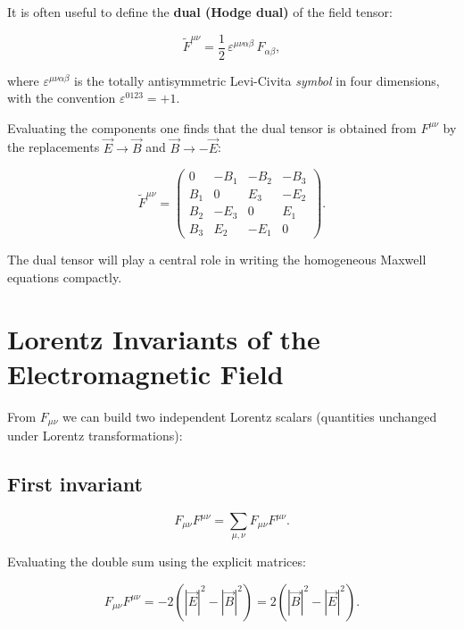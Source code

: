 It is often useful to define the \textbf{dual (Hodge dual)} of the field tensor:

\begin{equation}
\widetilde{F}^{\mu\nu} = \frac{1}{2}\,\varepsilon^{\mu\nu\alpha\beta}\,F_{\alpha\beta},
\end{equation}

where $\varepsilon^{\mu\nu\alpha\beta}$ is the totally antisymmetric Levi-Civita \emph{symbol} in four dimensions, with the convention $\varepsilon^{0123} = +1$.

Evaluating the components one finds that the dual tensor is obtained from $F^{\mu\nu}$ by the replacements $\vec{E} \to \vec{B}$ and $\vec{B} \to -\vec{E}$:

\begin{equation}
\boxed{
\widetilde{F}^{\mu\nu} = \begin{pmatrix}
0 & -B_1 & -B_2 & -B_3 \\
B_1 & 0 & E_3 & -E_2 \\
B_2 & -E_3 & 0 & E_1 \\
B_3 & E_2 & -E_1 & 0
\end{pmatrix}.}
\end{equation}

The dual tensor will play a central role in writing the homogeneous Maxwell equations compactly.

\section{Lorentz Invariants of the Electromagnetic Field}

From $F_{\mu\nu}$ we can build two independent Lorentz scalars (quantities unchanged under Lorentz transformations):

\subsection*{First invariant}

\begin{equation}
F_{\mu\nu}F^{\mu\nu} = \sum_{\mu,\nu} F_{\mu\nu}F^{\mu\nu}.
\end{equation}

Evaluating the double sum using the explicit matrices:

\begin{equation}
\boxed{F_{\mu\nu}F^{\mu\nu} = -2\!\left(|\vec{E}|^2 - |\vec{B}|^2\right) = 2\!\left(|\vec{B}|^2 - |\vec{E}|^2\right).}
\end{equation}

